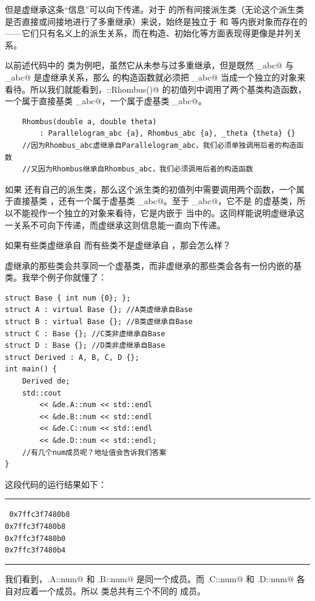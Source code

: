 但是虚继承这条``信息''可以向下传递。对于 \lstinline@Base@ 的所有间接派生类（无论这个派生类是否直接或间接地进行了多重继承）来说，\lstinline@Base@ 始终是独立于 \lstinline@A@ 和 \lstinline@B@ 等内嵌对象而存在的——它们只有名义上的派生关系，而在构造、初始化等方面表现得更像是并列关系。\par
以前述代码中的 \lstinline@Rhombus@ 类为例吧，虽然它从未参与过多重继承，但是既然 \lstinline@Rhombus_abc@ 与 \lstinline@Parallelogram_abc@ 是虚继承关系，那么 \lstinline@Rhombus@ 的构造函数就必须把 \lstinline@Parallelogram_abc@ 当成一个独立的对象来看待。所以我们就能看到，\lstinline@Rhombus::Rhombus()@ 的初值列中调用了两个基类构造函数，一个属于直接基类 \lstinline@Rhombus_abc@，一个属于虚基类 \lstinline@Parallelogram_abc@。\par
\begin{lstlisting}
    Rhombus(double a, double theta)
        : Parallelogram_abc {a}, Rhombus_abc {a}, _theta {theta} {}
    //因为Rhombus_abc虚继承自Parallelogram_abc，我们必须单独调用后者的构造函数
    //又因为Rhombus继承自Rhombus_abc，我们必须调用后者的构造函数
\end{lstlisting}\par
如果 \lstinline@Rhombus@ 还有自己的派生类，那么这个派生类的初值列中需要调用两个函数，一个属于直接基类 \lstinline@Rhombus@，还有一个属于虚基类 \lstinline@Parallelogram_abc@。至于 \lstinline@Rhombus_abc@，它不是 \lstinline@Rhombus@ 的虚基类，所以不能视作一个独立的对象来看待，它是内嵌于 \lstinline@Rhombus@ 当中的。这同样能说明虚继承这一关系不可向下传递，而虚继承这则信息能一直向下传递。\par
{\kaishu 如果有些类虚继承自 \lstinline@Base@ 而有些类不是虚继承自 \lstinline@Base@，那会怎么样？}\par
虚继承的那些类会共享同一个虚基类，而非虚继承的那些类会各有一份内嵌的基类。我举个例子你就懂了：
\begin{lstlisting}
struct Base { int num {0}; };
struct A : virtual Base {}; //A类虚继承自Base
struct B : virtual Base {}; //B类虚继承自Base
struct C : Base {}; //C类非虚继承自Base
struct D : Base {}; //D类非虚继承自Base
struct Derived : A, B, C, D {};
int main() {
    Derived de;
    std::cout
        << &de.A::num << std::endl
        << &de.B::num << std::endl
        << &de.C::num << std::endl
        << &de.D::num << std::endl;
    //有几个num成员呢？地址值会告诉我们答案
}
\end{lstlisting}
这段代码的运行结果如下：\\\noindent\rule{\linewidth}{.2pt}\texttt{
0x7ffc3f7480b8\\
0x7ffc3f7480b8\\
0x7ffc3f7480b0\\
0x7ffc3f7480b4
}\\\noindent\rule{\linewidth}{.2pt}
我们看到，\lstinline@d.A::num@ 和 \lstinline@d.B::num@ 是同一个成员。而 \lstinline@d.C::num@ 和 \lstinline@d.D::num@ 各自对应着一个成员。所以 \lstinline@Derived@ 类总共有三个不同的 \lstinline@num@ 成员。\par
